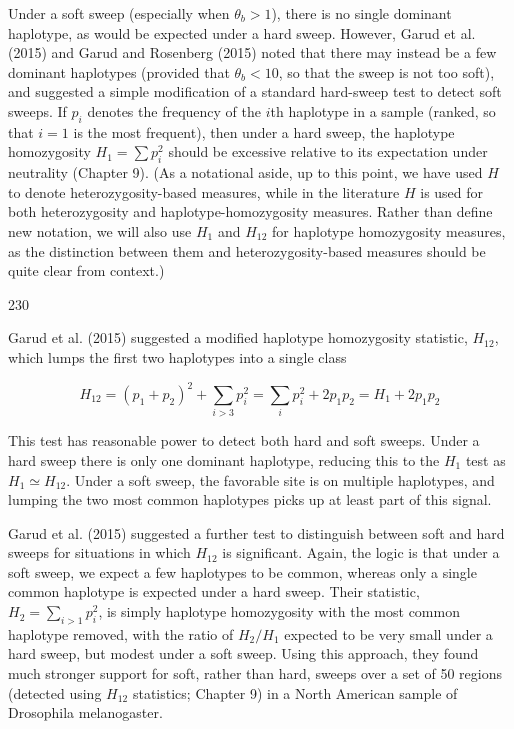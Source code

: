 \documentclass{article}
\begin{document}
Under a soft sweep (especially when  $ \theta_b > 1 $), there is no single dominant haplotype, as would be expected under a hard sweep. However, Garud et al. (2015) and Garud and Rosenberg (2015) noted that there may instead be a few dominant haplotypes (provided that  $ \theta_b < 10 $, so that the sweep is not too soft), and suggested a simple modification of a standard hard-sweep test to detect soft sweeps. If  $ p_i $ denotes the frequency of the  $ i $th haplotype in a sample (ranked, so that  $ i = 1 $ is the most frequent), then under a hard sweep, the haplotype homozygosity  $ H_1 = \sum p_i^2 $ should be excessive relative to its expectation under neutrality (Chapter 9). (As a notational aside, up to this point, we have used  $ H $ to denote heterozygosity-based measures, while in the literature  $ H $ is used for both heterozygosity and haplotype-homozygosity measures. Rather than define new notation, we will also use  $ H_1 $ and  $ H_{12} $ for haplotype homozygosity measures, as the distinction between them and heterozygosity-based measures should be quite clear from context.)

230

Garud et al. (2015) suggested a modified haplotype homozygosity statistic,  $ H_{12} $, which lumps the first two haplotypes into a single class

\begin{equation}
H_{12}=(p_{1}+p_{2})^{2}+\sum_{i>3}p_{i}^{2}=\sum_{i}p_{i}^{2}+2p_{1}p_{2}=H_{1}+2p_{1}p_{2}
\tag{8.16c}
\label{eq:8_16c}
\end{equation}

This test has reasonable power to detect both hard and soft sweeps. Under a hard sweep there is only one dominant haplotype, reducing this to the  $ H_{1} $ test as  $ H_{1} \simeq H_{12} $. Under a soft sweep, the favorable site is on multiple haplotypes, and lumping the two most common haplotypes picks up at least part of this signal.

Garud et al. (2015) suggested a further test to distinguish between soft and hard sweeps for situations in which  $ H_{12} $ is significant. Again, the logic is that under a soft sweep, we expect a few haplotypes to be common, whereas only a single common haplotype is expected under a hard sweep. Their statistic,  $ H_{2} = \sum_{i > 1} p_{i}^{2} $, is simply haplotype homozygosity with the most common haplotype removed, with the ratio of  $ H_{2}/H_{1} $ expected to be very small under a hard sweep, but modest under a soft sweep. Using this approach, they found much stronger support for soft, rather than hard, sweeps over a set of 50 regions (detected using  $ H_{12} $ statistics; Chapter 9) in a North American sample of Drosophila melanogaster.
\end{document}
